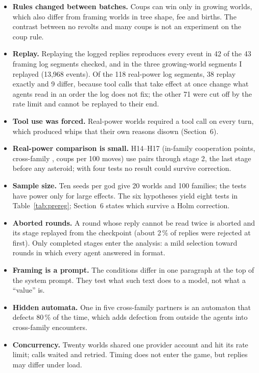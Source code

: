 \begin{itemize}
  untested.
  \item \textbf{Rules changed between batches.} Coups can win only in growing worlds, which
  also differ from framing worlds in tree shape, fee and births. The contrast between no
  revolts and many coups is not an experiment on the coup rule.
  \item \textbf{Replay.} Replaying the logged replies reproduces every event in 42 of the 43 framing log segments
checked, and in the three growing-world segments I replayed (13,968 events). Of the 118 real-power log segments, 38 replay
  exactly and 9 differ, because tool calls that take effect at once change what agents read in
  an order the log does not fix; the other 71 were cut off by the rate limit and cannot be
  replayed to their end.
  \item \textbf{Tool use was forced.} Real-power worlds required a tool call on every turn,
  which produced whips that their own reasons disown (Section~6).
  \item \textbf{Real-power comparison is small.} H14--H17 (in-family cooperation \HFourteen{} points, cross-family \HFifteen{}, coups \HSixteen{} per 100 moves) use \PowerPairs{} pairs through stage 2, the
  last stage before any asteroid; with four tests no result could survive correction.
  \item \textbf{Sample size.} Ten seeds per god give 20 worlds and 100 families; the
  tests have power only for large effects. The six hypotheses yield eight tests in Table~\ref{tab:prereg}; Section~6 states which
  survive a Holm correction.
  \item \textbf{Aborted rounds.} A round whose reply cannot be read twice is aborted and
  its stage replayed from the checkpoint (about 2\,\% of replies were rejected at
  first). Only completed stages enter the analysis: a mild selection toward rounds in
  which every agent answered in format.
  \item \textbf{Framing is a prompt.} The conditions differ in one paragraph at the top of
  the system prompt. They test what such text does to a model, not what a
  ``value'' is.
  \item \textbf{Hidden automata.} One in five cross-family partners is an automaton that
  defects 80\,\% of the time, which adds defection from outside the agents into cross-family encounters.
  \item \textbf{Concurrency.} Twenty worlds shared one provider account and hit its rate
  limit; calls waited and retried. Timing does not enter the game, but replies may differ
  under load.
\end{itemize}

